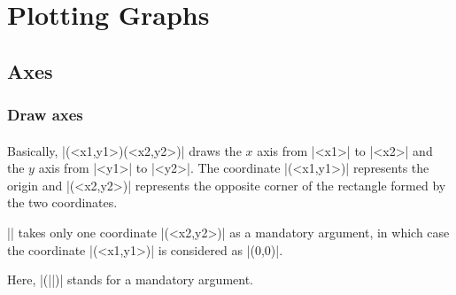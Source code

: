 %

\part{Plotting Graphs}
\label{p:plotting}


\chapter{Axes}
\label{c:axes}




\section{Draw axes}
\label{s:tzaxes}

\subsection{\protect\cmd{\tzaxes}}
\label{ss:tzaxes}

Basically, \icmd{\tzaxes}|(<x1,y1>)(<x2,y2>)| draws the $x$ axis from |<x1>| to |<x2>| and the $y$ axis from |<y1>| to |<y2>|.
The coordinate |(<x1,y1>)| represents the origin and |(<x2,y2>)| represents the opposite corner of the rectangle formed by the two coordinates.

|\tzaxes| takes only one coordinate |(<x2,y2>)| as a mandatory argument, in which case the coordinate |(<x1,y1>)| is considered as |(0,0)|.


Here, |(||)| stands for a mandatory argument.

